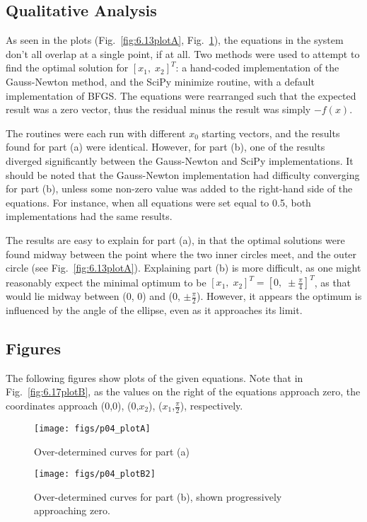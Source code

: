 \documentclass[paper=a4, fontsize=11pt]{scrartcl}
\numberwithin{equation}{section}		%
\numberwithin{figure}{section}			%
\numberwithin{table}{section}				%
\begin{document}
\subsection{Qualitative Analysis}
\par As seen in the plots (Fig.~\ref{fig:6.13plotA}, Fig.~\ref{fig:6.13plotB}), the equations in the system don't all overlap at a single point, if at all. Two methods were used to attempt to find the optimal solution for $[x_1, \; x_2]^T$: a hand-coded implementation of the Gauss-Newton method, and the SciPy minimize routine, with a default implementation of BFGS. The equations were rearranged such that the expected result was a zero vector, thus the residual minus the result was simply $-f(x)$. \\
\par The routines were each run with different $x_0$ starting vectors, and the results found for part (a) were identical. However, for part (b), one of the results diverged significantly between the Gauss-Newton and SciPy implementations. It should be noted that the Gauss-Newton implementation had difficulty converging for part (b), unless some non-zero value was added to the right-hand side of the equations. For instance, when all equations were set equal to 0.5, both implementations had the same results. \\
\par The results are easy to explain for part (a), in that the optimal solutions were found midway between the point where the two inner circles meet, and the outer circle (see Fig.~\ref{fig:6.13plotA}). Explaining part (b) is more difficult, as one might reasonably expect the minimal optimum to be $[x_1, \; x_2]^T = [0, \; \pm \frac{\pi}{4}]^T$, as that would lie midway between (0, 0) and (0, $\pm \frac{\pi}{2}$). However, it appears the optimum is influenced by the angle of the ellipse, even as it approaches its limit. \\


\vspace{4mm}
\subsection{Figures}
\par The following figures show plots of the given equations. Note that in Fig.~\ref{fig:6.17plotB}, as the values on the right of the equations approach zero, the coordinates approach (0,0), (0,$x_2$), ($x_1$,$\frac{\pi}{2}$), respectively. \\
\begin{figure}[!hbt]
		\texttt{[image: figs/p04\_plotA]}
		\caption{Over-determined curves for part (a)}
		\label{fig:6.13plotA}
	\endminipage\hfill
		\texttt{[image: figs/p04\_plotB2]}
		\caption{Over-determined curves for part (b), shown progressively approaching zero.}
		\label{fig:6.13plotB}
	\endminipage\hfill
\end{figure}
\end{document}
